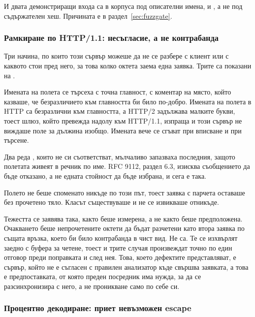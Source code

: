 И двата демонстриращи входа са в корпуса под описателни имена,
 и , а не под съдържателен хеш. Причината
е в раздел~\ref{sec:fuzzgate}.

\subsubsection{Рамкиране по HTTP/1.1: несъгласие, а не контрабанда}

Три начина, по които този сървър можеше да не се разбере с клиент или с каквото стои пред
него, за това колко октета заема една заявка. Трите са показани на .



Имената на полета се търсеха с точна главност, с коментар на място, който казваше, че
безразличието към главността би било по-добро. Имената на полета в HTTP са безразлични към
главността, а HTTP/2 задължава малките букви, тоест шлюз, който превежда надолу към HTTP/1.1,
изпраща  и този сървър не виждаше поле за дължина изобщо. Имената вече
се сгъват при вписване и при търсене.

Два реда , които не си съответстват, мълчаливо запазваха последния,
защото полетата живеят в речник по име. RFC 9112, раздел 6.3, изисква съобщението да бъде
отказано, а не едната стойност да бъде избрана, и сега е така.

Полето  не беше споменато никъде по този път, тоест заявка с парчета
оставаше без прочетено тяло. Класът  съществуваше и не се извикваше
отникъде.

Тежестта се заявява така, както беше измерена, а не както беше предположена. Очакването беше
непрочетените октети да бъдат разчетени като втора заявка по същата връзка, което би било
контрабанда в чист вид. Не са. Те се изхвърлят заедно с буфера за четене, тоест и трите
случая произвеждат точно по един отговор преди поправката и след нея. Това, което дефектите
представляват, е сървър, който не е съгласен с правилен анализатор къде свършва заявката, а
това е предпоставката, от която преден посредник има нужда, за да се разсинхронизира с него,
а не проникване само по себе си.

\subsubsection{Процентно декодиране: приет невъзможен escape}

